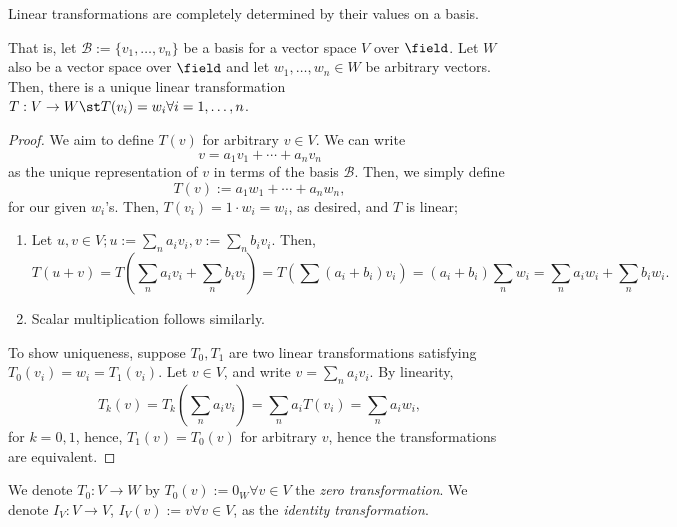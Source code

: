 \begin{theorem}\label{thm:basisdeteremineslineartransformation}
    Linear transformations are completely determined by their values on a basis. 
    
    That is, let $\mathcal{B} := \{v_1, \dots, v_n\}$ be a basis for a vector space $V$ over $\field$. Let $W$ also be a vector space over $\field$ and let $w_1, \dots, w_n \in W$ be arbitrary vectors. Then, there is a unique linear transformation $T : V \to W \st T(v_i) = w_i \forall i = 1, \dots, n$.
\end{theorem}

\begin{proof}
    We aim to define $T(v)$ for arbitrary $v \in V$. We can write \[
    v = a_1 v_1 + \cdots + a_n v_n    
    \]
    as the unique representation of $v$ in terms of the basis $\mathcal{B}$. Then, we simply define \[
        T(v) := a_1 w_1 + \cdots + a_n w_n,
    \]
    for our given $w_i$'s. Then, $T(v_i) = 1 \cdot w_i = w_i$, as desired, and $T$ is linear; \begin{enumerate}
        \item Let $u, v \in V; u := \sum_{n} a_i v_i, v:= \sum_{n} b_i v_i$. Then, \[
        T(u + v) = T(\sum_{n} a_i v_i+\sum_{n} b_i v_i) = T(\sum (a_i + b_i) v_i)  = (a_i + b_i) \sum_n w_i =  \sum_{n} a_i w_i + \sum_{n} b_i w_i.
        \]
        \item Scalar multiplication follows similarly.
    \end{enumerate}

    To show uniqueness, suppose $T_0, T_1$ are two linear transformations satisfying $T_0(v_i) = w_i = T_1(v_i)$. Let $v \in V$, and write $v = \sum_{n} a_i v_i$. By linearity, \[
    T_k (v) = T_k(\sum_n a_i v_i) = \sum_n a_i T(v_i) = \sum_n a_i w_i,    
    \]
    for $k = 0, 1$, hence, $T_1(v) = T_0(v)$ for arbitrary $v$, hence the transformations are equivalent.
\end{proof}

\begin{definition}
    We denote $T_0: V \to W$ by $T_0(v) := 0_W \forall v \in V$ the \emph{zero transformation}. We denote $I_V : V \to V$, $I_V(v) := v \forall v \in V$, as the \emph{identity transformation}.
\end{definition}